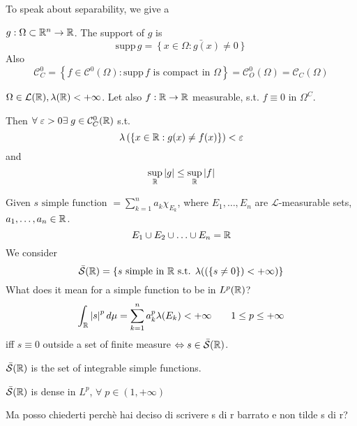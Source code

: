 To speak about separability, we give a 
\begin{definition}
    \(g: \Omega \subset \mathbb{R}^n \to \mathbb{R}\). The support of \(g\) is
    \[
      \mbox{supp}\, g = \bar{\left\{ x \in \Omega : g(x) \neq 0 \right\}}
    \]
    Also 
    \[
        \mathcal{C}^0_C = \left\{ f \in \mathcal{C}^0\left( \Omega \right) : \mbox{supp} \, f \mbox{ is compact in } \Omega\right\} = \mathcal{C}^0_O(\Omega) = \mathcal{C}_C(\Omega)
    \]
\end{definition}
\begin{theorem}
    \(\Omega \in \mathcal{L}(\mathbb{R}), \lambda(\mathbb{R}) < +\infty\). Let also \(f : \mathbb{R} \to \mathbb{R}\) measurable, s.t. \(f\equiv 0\) in \(\Omega^C\).

    Then \(\forall \; \varepsilon > 0 \exists \; g \in \mathcal{C}^0_C(\mathbb{R})\) s.t.
    \[
        \lambda \left( \left\{ x \in \mathbb{R} : g(x) \neq f(x) \right\} \right) < \varepsilon
    \]
    and
    \[
        \sup_{\mathbb{R}} \abs{g} \leq \sup_{\mathbb{R}} \abs{f}
    \]
\end{theorem}
\begin{definition}
    Given \(s \mbox{ simple function } = \sum_{k=1}^n a_k \chi_{E_k}\), where \(E_1, \ldots, E_n\) are \(\mathcal{L}\)-measurable sets, \(a_1, \ldots, a_n \in \mathbb{R}\). 
    \[
        E_1 \cup E_2 \cup \ldots \cup E_n = \mathbb{R}
    \]
    We consider
    \[
        \bar{\mathcal{S}}(\mathbb{R}) = \left\{ s \mbox{ simple in } \mathbb{R} \mbox{ s.t. } \lambda(\left( \left\{ s \neq 0 \right\} \right) < +\infty) \right\}
    \]
    What does it mean for a simple function to be in \(L^p(\mathbb{R})\)? 
    \[
        \int_{\mathbb{R}} \abs{s}^p \, d\mu = \sum_{k=1}^n a_k^p \lambda(E_k) < +\infty
    \tag*{\(1 \leq p \leq +\infty\)}\]
    iff \(s \equiv 0\) outside a set of finite measure \(\Leftrightarrow s \in \bar{\mathcal{S}}(\mathbb{R})\).

    \(\bar{\mathcal{S}}(\mathbb{R})\) is the set of integrable simple functions.
\end{definition}
\begin{theorem}
    \(\bar{\mathcal{S}}(\mathbb{R})\) is dense in \(L^p\), \(\forall \; p \in (1, +\infty)\)
\end{theorem}
Ma posso chiederti perchè hai deciso di scrivere s di r barrato e non tilde s di r?
